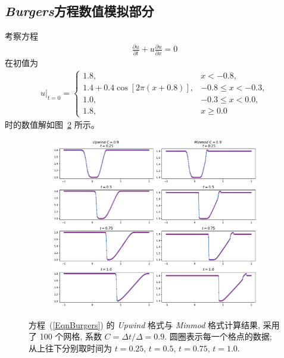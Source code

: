 \documentclass[10.5pt
]{article}
\begin{document}
\subsection{\textit{Burgers}方程数值模拟部分}
考察方程
\begin{align}
\frac{\partial u}{\partial t} + u \frac{\partial u}{\partial x} = 0
\end{align}
在初值为
\begin{align}
u|_{t=0} = \left\{\begin{array}{ll} 1.8, & x < -0.8,
\\
1.4 + 0.4 \cos\left[2 \pi (x + 0.8) \right], & -0.8 \le x < -0.3,
\\
1.0, & -0.3 \le x < 0.0,
\\
1.8, & x \ge 0.0
\end{array} \right.
\end{align}
时的数值解如图~\ref{fig:problem2} 所示。
\begin{figure} 
\centering
\begin{subfigure}{.9\linewidth}
  \includegraphics[width=\textwidth]{figures/problem2_myron.pdf} %
	\caption{}
  \label{fig:problem2}
\end{subfigure}
\caption{%
    方程~(\ref{EqnBurgers}) 的 \textit{Upwind} 格式与 \textit{Minmod} 格式计算结果, 采用了 100 个网格, 系数 $C  = \Delta t / \Delta = 0.9$. 
    圆圈表示每一个格点的数据;
  从上往下分别取时间为 $t = 0.25$, $t = 0.5$, $t = 0.75$, $t = 1.0$.
}
  \label{fig:problem2}%
\end{figure}
\end{document}
